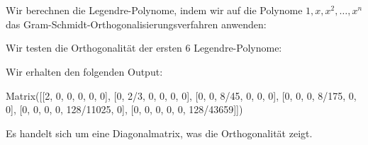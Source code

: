 \section{}

Wir berechnen die Legendre-Polynome, indem wir auf die Polynome $1, x, x^2, \dotsc, x^n$ das Gram-Schmidt-Orthogonalisierungsverfahren anwenden:



Wir testen die Orthogonalität der ersten $6$ Legendre-Polynome:



Wir erhalten den folgenden Output:

\begin{consoleoutput}
Matrix([[2, 0, 0, 0, 0, 0], [0, 2/3, 0, 0, 0, 0], [0, 0, 8/45, 0, 0, 0], [0, 0, 0, 8/175, 0, 0], [0, 0, 0, 0, 128/11025, 0], [0, 0, 0, 0, 0, 128/43659]])
\end{consoleoutput}

Es handelt sich um eine Diagonalmatrix, was die Orthogonalität zeigt.
